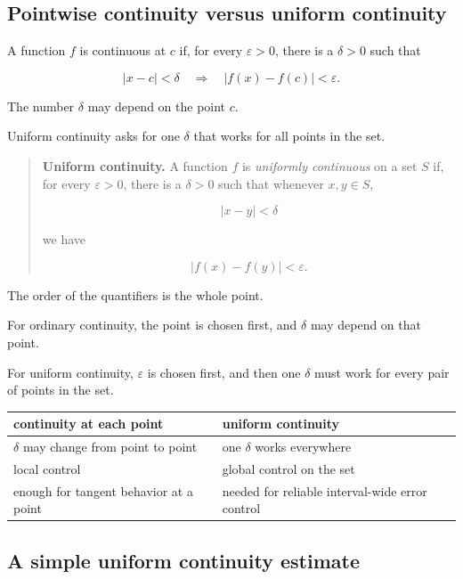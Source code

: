 \subsection{Pointwise continuity versus uniform continuity}
\label{appsubsec:pointwise-vs-uniform-continuity}

A function \(f\) is continuous at \(c\) if, for every \(\varepsilon>0\), there is a
\(\delta>0\) such that

\[
|x-c|<\delta
\quad\Longrightarrow\quad
|f(x)-f(c)|<\varepsilon.
\]

The number \(\delta\) may depend on the point \(c\).

Uniform continuity asks for one \(\delta\) that works for all points in the set.

\begin{quote}
\textbf{Uniform continuity.}
A function \(f\) is \emph{uniformly continuous} on a set \(S\) if, for every
\(\varepsilon>0\), there is a \(\delta>0\) such that whenever \(x,y\in S\),

\[
|x-y|<\delta
\]

we have

\[
|f(x)-f(y)|<\varepsilon.
\]
\end{quote}

The order of the quantifiers is the whole point.

For ordinary continuity, the point is chosen first, and \(\delta\) may depend on that
point.

For uniform continuity, \(\varepsilon\) is chosen first, and then one \(\delta\) must work
for every pair of points in the set.

\begin{center}
\renewcommand{\arraystretch}{1.7}
\begin{tabular}{p{}|p{}}
\textbf{continuity at each point} & \textbf{uniform continuity} \\ \hline
\(\delta\) may change from point to point & one \(\delta\) works everywhere \\ \hline
local control & global control on the set \\ \hline
enough for tangent behavior at a point & needed for reliable interval-wide error control
\end{tabular}
\end{center}

\subsection{A simple uniform continuity estimate}
\label{appsubsec:simple-uniform-estimate}

